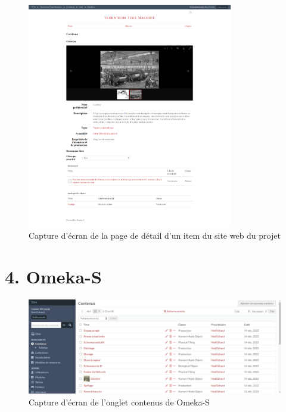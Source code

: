 \begin{figure} [H]
    \centering
    \includegraphics[width=0.8\textwidth]{assets/annexes/omeka_details.png}
    \caption{Capture d'écran de la page de détail d'un item du site web du projet}
    \label{fig:detailItemOmeka}
\end{figure}

\section*{4. Omeka-S}\label{annexe4}
\begin{figure} [H]
    \centering
    \includegraphics[width=1\textwidth]{assets/omeka/onglet_contenu_omeka.png}
    \caption{Capture d'écran de l'onglet contenus de Omeka-S}
    \label{fig:pageContenusOmeka}
\end{figure}

